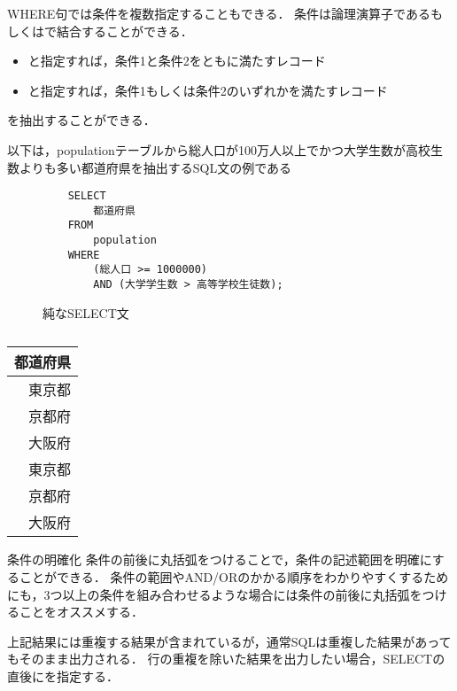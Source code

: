 WHERE句では条件を複数指定することもできる． 条件は論理演算子であるもしくはで結合することができる．
\begin{itemize}
\item {}と指定すれば，条件1と条件2をともに満たすレコード
\item {}と指定すれば，条件1もしくは条件2のいずれかを満たすレコード
\end{itemize}
を抽出することができる．

以下は，populationテーブルから総人口が100万人以上でかつ大学生数が高校生数よりも多い都道府県を抽出するSQL文の例である
\begin{figure}[tb]
    \begin{verbatim}
    SELECT
        都道府県
    FROM
        population
    WHERE
        (総人口 >= 1000000)
        AND (大学学生数 > 高等学校生徒数);
    \end{verbatim}
    \captionsetup{name=コード}
    \caption{純なSELECT文}
    \label{code:sql-where3}
\end{figure}
\begin{table}[tb]
    \centering
    \begin{tabular}{r}
    \toprule
    \textbf{都道府県} \\ \midrule
    東京都           \\
    京都府           \\
    大阪府           \\
    東京都           \\
    京都府           \\
    大阪府           \\ \bottomrule
    \end{tabular}
    \caption{}
    \label{tb:}
\end{table}

\begin{tipbox}{条件の明確化}
    条件の前後に丸括弧をつけることで，条件の記述範囲を明確にすることができる．
    条件の範囲やAND/ORのかかる順序をわかりやすくするためにも，3つ以上の条件を組み合わせるような場合には条件の前後に丸括弧をつけることをオススメする．
\end{tipbox}

上記結果には重複する結果が含まれているが，通常SQLは重複した結果があってもそのまま出力される．
行の重複を除いた結果を出力したい場合，SELECTの直後にを指定する．

